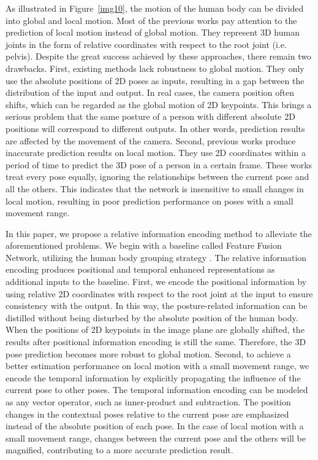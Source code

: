 \documentclass[sigconf]{acmart}
\begin{document}
As illustrated in Figure~\ref{img10}, the motion of the human body can be divided into global and local motion. Most of the previous works \cite{martinez2017simple,liu2020attention,cheng2019occlusion,sun2017compositional,cai2019exploiting,liu2020attention} pay attention to the prediction of local motion instead of global motion. They represent 3D human joints in the form of relative coordinates with respect to the root joint (i.e. pelvis). Despite the great success achieved by these approaches, there remain two drawbacks. First, existing methods lack robustness to global motion. They only use the absolute positions of 2D poses as inputs, resulting in a gap between the distribution of the input and output. In real cases, the camera position often shifts, which can be regarded as the global motion of 2D keypoints. This brings a serious problem that the same posture of a person with different absolute 2D positions will correspond to different outputs. In other words, prediction results are affected by the movement of the camera. Second, previous works \cite{jllo20193d,liu2020attention} produce inaccurate prediction results on local motion. They use 2D coordinates within a period of time to predict the 3D pose of a person in a certain frame. These works treat every pose equally, ignoring the relationships between the current pose and all the others. This indicates that the network is insensitive to small changes in local motion, resulting in poor prediction performance on poses with a small movement range.


In this paper, we propose a relative information encoding method to alleviate the aforementioned problems. We begin with a baseline called Feature Fusion Network, utilizing the human body grouping strategy \cite{park20183d}. The relative information encoding produces positional and temporal enhanced representations as additional inputs to the baseline. First, we encode the positional information by using relative 2D coordinates with respect to the root joint at the input to ensure consistency with the output. In this way, the posture-related information can be distilled without being disturbed by the absolute position of the human body. When the positions of 2D keypoints in the image plane are globally shifted, the results after positional information encoding is still the same. Therefore, the 3D pose prediction becomes more robust to global motion. Second, to achieve a better estimation performance on local motion with a small movement range, we encode the temporal information by explicitly propagating the influence of the current pose to other poses. The temporal information encoding can be modeled as any vector operator, such as inner-product and subtraction. The position changes in the contextual poses relative to the current pose are emphasized instead of the absolute position of each pose. In the case of local motion with a small movement range, changes between the current pose and the others will be magnified, contributing to a more accurate prediction result. 
\end{document}
